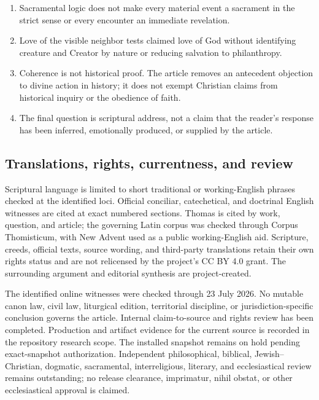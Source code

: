 \begin{enumerate}[leftmargin=1.45em,itemsep=0.25em]
\item Sacramental logic does not make every material event a sacrament in the strict sense or every encounter an immediate revelation.
\item Love of the visible neighbor tests claimed love of God without identifying creature and Creator by nature or reducing salvation to philanthropy.
\item Coherence is not historical proof. The article removes an antecedent objection to divine action in history; it does not exempt Christian claims from historical inquiry or the obedience of faith.
\item The final question is scriptural address, not a claim that the reader's response has been inferred, emotionally produced, or supplied by the article.
\end{enumerate}

\subsection{Translations, rights, currentness, and review}

Scriptural language is limited to short traditional or working-English phrases checked at the identified loci. Official conciliar, catechetical, and doctrinal English witnesses are cited at exact numbered sections. Thomas is cited by work, question, and article; the governing Latin corpus was checked through Corpus Thomisticum, with New Advent used as a public working-English aid. Scripture, creeds, official texts, source wording, and third-party translations retain their own rights status and are not relicensed by the project's CC BY 4.0 grant. The surrounding argument and editorial synthesis are project-created.

The identified online witnesses were checked through 23 July 2026. No mutable canon law, civil law, liturgical edition, territorial discipline, or jurisdiction-specific conclusion governs the article. Internal claim-to-source and rights review has been completed. Production and artifact evidence for the current source is recorded in the repository research scope. The installed snapshot remains on hold pending exact-snapshot authorization. Independent philosophical, biblical, Jewish--Christian, dogmatic, sacramental, interreligious, literary, and ecclesiastical review remains outstanding; no release clearance, imprimatur, nihil obstat, or other ecclesiastical approval is claimed.
